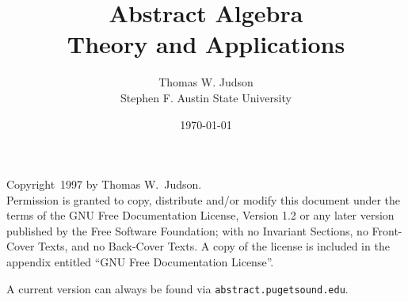 \documentclass[11pt]{book}
\title{{\bf Abstract Algebra}\\Theory and Applications}
\author{Thomas W. Judson\\Stephen F. Austin State University}
\date{\today}
\begin{document}
%
\pagestyle{headings}
%
\frontmatter
%
\maketitle
%

\noindent Copyright\ 1997 by Thomas W.\ Judson.\\[12pt]
Permission is granted to copy, distribute and/or modify this document under the terms of the GNU Free Documentation License, Version 1.2 or any later version published by the Free Software Foundation; with no Invariant Sections, no Front-Cover Texts, and no Back-Cover Texts.  A copy of the license is included in the appendix entitled ``GNU Free Documentation License''.\par
\bigskip
%
\noindent 
A current version can always be found via {\tt abstract.pugetsound.edu}.
\clearpage
%

%
%
\mainmatter
%
%
%
%
%
%
\backmatter
%

{\small}

{\small\printindex}
%
%
\end{document}

